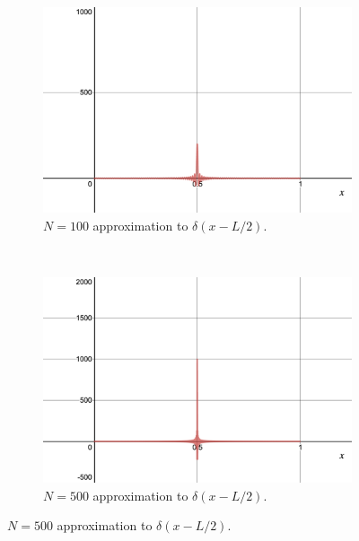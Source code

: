 \documentclass[12pt]{article} %
\begin{document}
\begin{solution}
\begin{enumerate}[(a)]
\begin{figure}[H]
								\begin{subfigure}[h]{0.4\textwidth}
									\includegraphics[width=\textwidth]{Figures/delta_N=100.png}
									\caption{$N=100$ approximation to $\delta(x-L/2)$.}
								\end{subfigure}			
								~
								\begin{subfigure}[h]{0.4\textwidth}
									\includegraphics[width=\textwidth]{Figures/delta_N=500.png}
									\caption{$N=500$ approximation to $\delta(x-L/2)$.}
								\end{subfigure}													
							\end{figure}
		\end{enumerate}
	
\end{solution}
\end{document}
